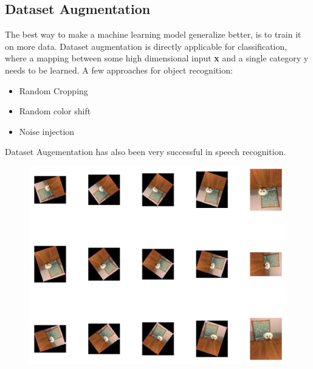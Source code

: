 \begin{multicols}{2}
		\subsection{Dataset Augmentation}
	The best way to make a machine learning model generalize better, is to train it on more data. Dataset augmentation is directly applicable for classification, where a mapping between some high dimensional input \textbf{x} and a single category y needs to be learned.
	A few approaches for object recognition:
	\begin{itemize}
		\item Random Cropping
		\item Random color shift
		\item Noise injection
	\end{itemize}
	Dataset Augementation has also been very successful in speech recognition.
	\begin{figure}[H]
		\centering
		\includegraphics[width=1\linewidth]{images/datasetAugementation.PNG}
	\end{figure}


\end{multicols}
